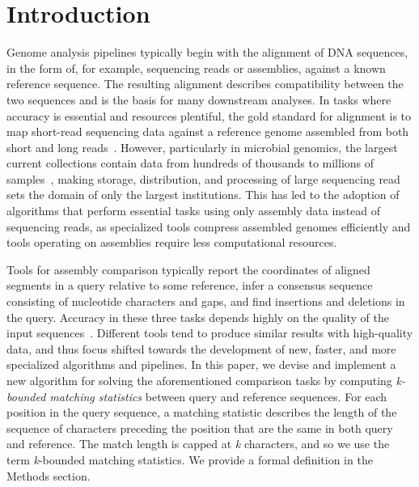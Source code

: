 \documentclass[unnumsec,webpdf,modern,large]{biorxiv}%
\theoremstyle{thmstyleone}%
\theoremstyle{thmstyletwo}%
\theoremstyle{thmstylethree}%
\begin{document}

\maketitle


\section{Introduction}
Genome analysis pipelines typically begin with the alignment of DNA sequences, in the form of, for example, sequencing reads or assemblies, against a known reference sequence. The resulting alignment describes compatibility between the two sequences and is the basis for many downstream analyses. In tasks where accuracy is essential and resources plentiful, the gold standard for alignment is to map short-read sequencing data against a reference genome assembled from both short and long reads~\cite{wick2023assembling}. However, particularly in microbial genomics, the largest current collections contain data from hundreds of thousands to millions of samples~\cite{parks2020complete,richardson2023mgnify,hunt2024allthebacteria}, making storage, distribution, and processing of large sequencing read sets the domain of only the largest institutions. This has led to the adoption of algorithms that perform essential tasks using only assembly data instead of sequencing reads, as specialized tools compress assembled genomes efficiently \cite{deorowicz2023agc,bvrinda2024efficient} and tools operating on assemblies require less computational resources.

Tools for assembly comparison typically report the coordinates of aligned segments in a query relative to some reference, infer a consensus sequence consisting of nucleotide characters and gaps, and find insertions and deletions in the query. Accuracy in these three tasks depends highly on the quality of the input sequences~\cite{wick2025reads}.
Different tools tend to produce similar results with high-quality data, and thus focus shifted towards the development of new, faster, and more specialized algorithms and pipelines. 
In this paper, we devise and implement a new algorithm for solving the aforementioned comparison tasks 
by computing {\em \emph{k}-bounded matching statistics} between query and reference sequences. 
For each position in the query sequence, a matching statistic describes the length of the sequence of characters preceding the position that are the same in both query and reference. The match length is capped at \emph{k} characters, and so we use the term \emph{k}-bounded matching statistics. We provide a formal definition in the Methods section.
\end{document}
